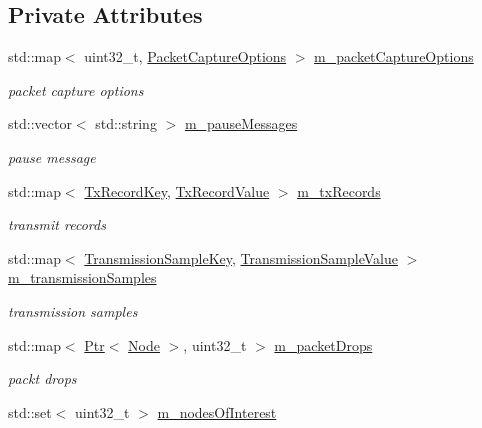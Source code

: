 \subsection*{Private Attributes}
\begin{DoxyCompactItemize}
\item 
std\+::map$<$ uint32\+\_\+t, \hyperlink{structns3_1_1PyViz_1_1PacketCaptureOptions}{Packet\+Capture\+Options} $>$ \hyperlink{classns3_1_1PyViz_a4649d891bf333dda1c272ca316224937}{m\+\_\+packet\+Capture\+Options}
\begin{DoxyCompactList}\small\item\em packet capture options \end{DoxyCompactList}\item 
std\+::vector$<$ std\+::string $>$ \hyperlink{classns3_1_1PyViz_a9a1b3409dabe3cfd0a42b5e361971656}{m\+\_\+pause\+Messages}
\begin{DoxyCompactList}\small\item\em pause message \end{DoxyCompactList}\item 
std\+::map$<$ \hyperlink{classns3_1_1PyViz_afe99c7883d8999b0d669eceda3254caf}{Tx\+Record\+Key}, \hyperlink{structns3_1_1PyViz_1_1TxRecordValue}{Tx\+Record\+Value} $>$ \hyperlink{classns3_1_1PyViz_ad051157796c1dee630ca8705ed89bbb6}{m\+\_\+tx\+Records}
\begin{DoxyCompactList}\small\item\em transmit records \end{DoxyCompactList}\item 
std\+::map$<$ \hyperlink{structns3_1_1PyViz_1_1TransmissionSampleKey}{Transmission\+Sample\+Key}, \hyperlink{structns3_1_1PyViz_1_1TransmissionSampleValue}{Transmission\+Sample\+Value} $>$ \hyperlink{classns3_1_1PyViz_ab5e919d5d58fc6088fc94f5792a34225}{m\+\_\+transmission\+Samples}
\begin{DoxyCompactList}\small\item\em transmission samples \end{DoxyCompactList}\item 
std\+::map$<$ \hyperlink{classns3_1_1Ptr}{Ptr}$<$ \hyperlink{classns3_1_1Node}{Node} $>$, uint32\+\_\+t $>$ \hyperlink{classns3_1_1PyViz_ae1e7568a80ebd9e74e2a5b6eb6c5c3c1}{m\+\_\+packet\+Drops}
\begin{DoxyCompactList}\small\item\em packt drops \end{DoxyCompactList}\item 
std\+::set$<$ uint32\+\_\+t $>$ \hyperlink{classns3_1_1PyViz_a84239071f012e9f0b3d16c11076f4d63}{m\+\_\+nodes\+Of\+Interest}

\end{DoxyCompactItemize}
